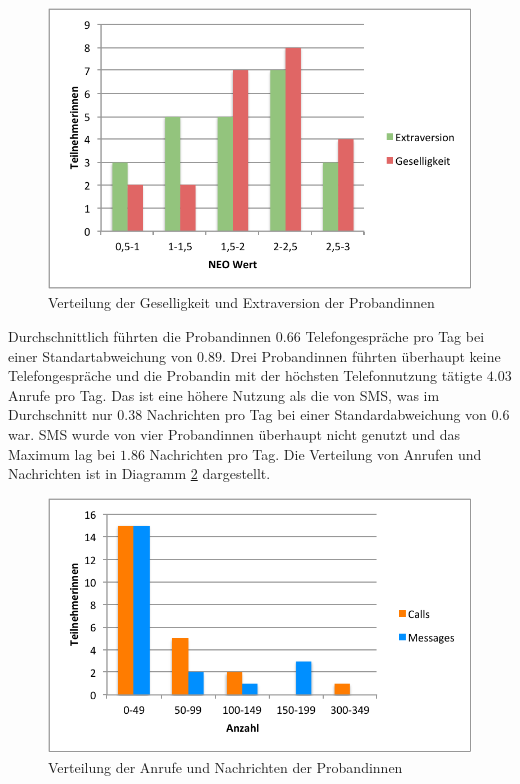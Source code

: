 \begin{figure}[h]
    \centering
    \includegraphics{images/NeoErgebnisse.pdf}
    \caption{Verteilung der Geselligkeit und Extraversion der Probandinnen}
    \label{fig:neoergebnisse}
\end{figure}

Durchschnittlich führten die Probandinnen $0.66$ Telefongespräche pro Tag bei einer Standartabweichung von $0.89$.
Drei Probandinnen führten überhaupt keine Telefongespräche und die Probandin mit der höchsten Telefonnutzung tätigte $4.03$ Anrufe pro Tag.
Das ist eine höhere Nutzung als die von SMS, was im Durchschnitt nur $0.38$ Nachrichten pro Tag bei einer Standardabweichung von $0.6$ war.
SMS wurde von vier Probandinnen überhaupt nicht genutzt und das Maximum lag bei $1.86$ Nachrichten pro Tag.
Die Verteilung von Anrufen und Nachrichten ist in Diagramm \ref{fig:callmessagesdistr} dargestellt.

\begin{figure}[h]
    \centering
    \includegraphics{images/callsMessagesDistr.pdf}
    \caption{Verteilung der Anrufe und Nachrichten der Probandinnen}
    \label{fig:callmessagesdistr}
\end{figure}


